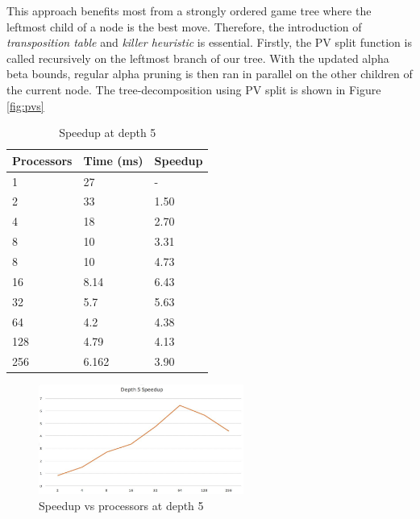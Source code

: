 \documentclass[12pt]{article}
\begin{document}
This approach benefits most from a strongly ordered game tree where the leftmost
child of a node is the best move. Therefore, the introduction of
\textit{transposition table} and \textit{killer heuristic} is essential.
Firstly, the PV split function is called recursively on the leftmost branch of
our tree. With the updated alpha beta bounds, regular alpha pruning is then ran
in parallel on the other children of the current node. The tree-decomposition
using PV split is shown in Figure \ref{fig:pvs}

\begin{table}[H]
\centering
\begin{tabular}{|l|l|l|}
\hline
Processors                         & Time (ms) & Speedup   \\ \hline
1                                  & 27        & -         \\ \hline
2                                  & 33        & 1.50      \\ \hline
4                                  & 18        & 2.70      \\ \hline
8                                  & 10        & 3.31      \\ \hline
8                                  & 10        & 4.73      \\ \hline
16                                 & 8.14      & 6.43      \\ \hline
32                                 & 5.7       & 5.63      \\ \hline
64                                 & 4.2       & 4.38      \\ \hline
128                                & 4.79      & 4.13      \\ \hline
256                                & 6.162     & 3.90      \\ \hline
\end{tabular}
\caption{Speedup at depth 5}
\end{table}

\begin{figure}[H]
  \centering
  \includegraphics[width=0.6\textwidth, height=0.4\textwidth]{speedup_processor.png}
  \caption{Speedup vs processors at depth 5}
  \label{fig:speedup_processor}
\end{figure}
\end{document}
